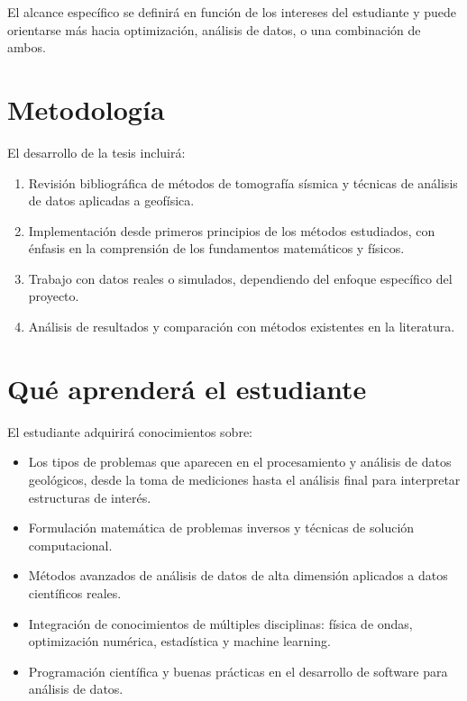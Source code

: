 \documentclass[11pt,a4paper]{article}
\begin{document}
El alcance específico se definirá en función de los intereses del estudiante y puede orientarse más hacia optimización, análisis de datos, o una combinación de ambos.

\section*{Metodología}

El desarrollo de la tesis incluirá:

\begin{enumerate}[leftmargin=*]
    \item Revisión bibliográfica de métodos de tomografía sísmica y técnicas de análisis de datos aplicadas a geofísica.
    
    \item Implementación desde primeros principios de los métodos estudiados, con énfasis en la comprensión de los fundamentos matemáticos y físicos.
    
    \item Trabajo con datos reales o simulados, dependiendo del enfoque específico del proyecto.
    
    \item Análisis de resultados y comparación con métodos existentes en la literatura.
\end{enumerate}

\section*{Qué aprenderá el estudiante}

El estudiante adquirirá conocimientos sobre:

\begin{itemize}[leftmargin=*]
    \item Los tipos de problemas que aparecen en el procesamiento y análisis de datos geológicos, desde la toma de mediciones hasta el análisis final para interpretar estructuras de interés.
    
    \item Formulación matemática de problemas inversos y técnicas de solución computacional.
    
    \item Métodos avanzados de análisis de datos de alta dimensión aplicados a datos científicos reales.
    
    \item Integración de conocimientos de múltiples disciplinas: física de ondas, optimización numérica, estadística y machine learning.
    
    \item Programación científica y buenas prácticas en el desarrollo de software para análisis de datos.
\end{itemize}
\end{document}

